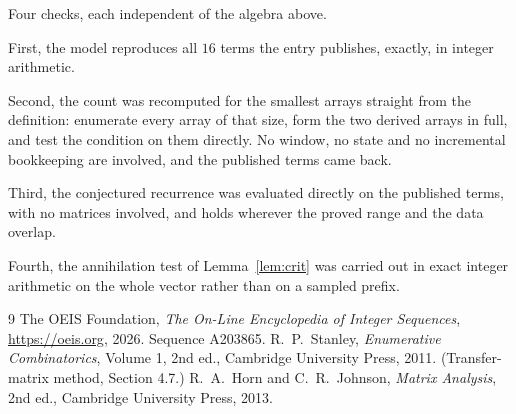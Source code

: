 \documentclass[11pt,a4paper]{article}
\theoremstyle{plain}
\theoremstyle{definition}
\begin{document}
Four checks, each independent of the algebra above.

First, the model reproduces all $16$ terms the entry publishes, exactly, in integer
arithmetic.

Second, the count was recomputed for the smallest arrays straight from the definition:
enumerate every array of that size, form the two derived arrays in full, and test the condition
on them directly. No window, no state and no incremental bookkeeping are involved, and the
published terms came back.

Third, the conjectured recurrence was evaluated directly on the published terms, with no
matrices involved, and holds wherever the proved range and the data overlap.

Fourth, the annihilation test of Lemma~\ref{lem:crit} was carried out in exact integer
arithmetic on the whole vector rather than on a sampled prefix.

\begin{thebibliography}{9}
 The OEIS Foundation, \emph{The On-Line Encyclopedia of Integer
Sequences}, \url{https://oeis.org}, 2026. Sequence A203865.
 R.~P.~Stanley, \emph{Enumerative Combinatorics}, Volume 1, 2nd ed.,
Cambridge University Press, 2011. (Transfer-matrix method, Section 4.7.)
 R.~A.~Horn and C.~R.~Johnson, \emph{Matrix Analysis}, 2nd ed., Cambridge
University Press, 2013.
\end{thebibliography}
\end{document}
